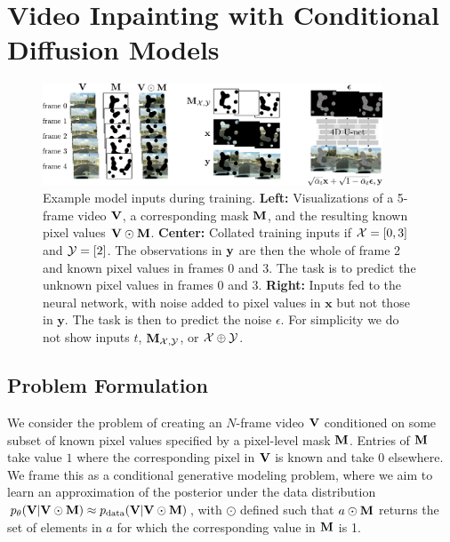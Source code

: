 \chapter{Video Inpainting with Conditional Diffusion Models}
\label{sec:VICDM}

\begin{figure}[t]
    \centering
        \includegraphics[width=0.9\textwidth]{figures/architecture-overview/video-inpainting-overview.pdf}
    \caption[Example model inputs during training.]{Example model inputs during training. \textbf{Left:} Visualizations of a 5-frame video $\mathbf{V}$, a corresponding mask $\mathbf{M}$, and the resulting known pixel values $\mathbf{V}\odot\mathbf{M}$. \textbf{Center:} Collated training inputs if $\mathcal{X} = [0, 3]$ and $\mathcal{Y} = [2]$. The observations in $\mathbf{y}$ are then the whole of frame 2 and known pixel values in frames 0 and 3. The task is to predict the unknown pixel values in frames 0 and 3. \textbf{Right:} Inputs fed to the neural network, with noise added to pixel values in $\mathbf{x}$ but not those in $\mathbf{y}$. The task is then to predict the noise $\epsilon$. For simplicity we do not show inputs $t$, $\mathbf{M}_{\mathcal{X},\mathcal{Y}}$, or $\mathcal{X}\oplus\mathcal{Y}$.}
    \label{fig:arch-and-training}
\end{figure}

\section{Problem Formulation}
We consider the problem of creating an $N$-frame video $\mathbf{V}$ conditioned on some subset of known pixel values specified by a pixel-level mask $\mathbf{M}$. Entries of $\mathbf{M}$ take value $1$ where the corresponding pixel in $\mathbf{V}$ is known and take $0$ elsewhere. We frame this as a conditional generative modeling problem, where we aim to learn an approximation of the posterior under the data distribution $p_\theta(\mathbf{V}|\mathbf{V} \odot \mathbf{M}) \approx p_\text{data}(\mathbf{V}|\mathbf{V} \odot \mathbf{M})$, with $\odot$ defined such that $a \odot \mathbf{M}$ returns the set of elements in $a$ for which the corresponding value in $\mathbf{M}$ is 1.


